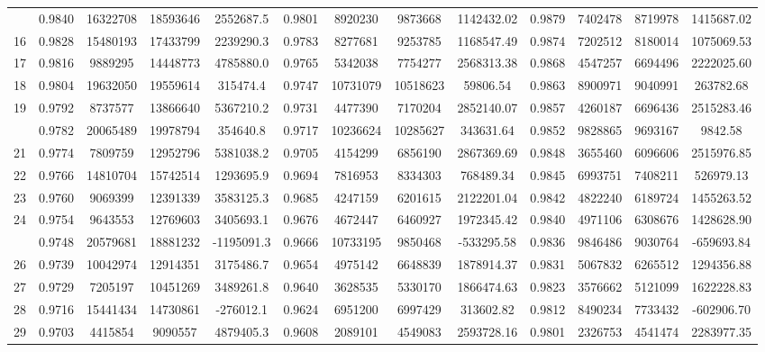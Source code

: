 \documentclass[
  12pt,
]{article}
\begin{document}
\begin{longtable}[t]{lcccccccccccc}
\addlinespace
15 & 0.9840 & 16322708 & 18593646 & 2552687.5 & 0.9801 & 8920230 & 9873668 & 1142432.02 & 0.9879 & 7402478 & 8719978 & 1415687.02\\
16 & 0.9828 & 15480193 & 17433799 & 2239290.3 & 0.9783 & 8277681 & 9253785 & 1168547.49 & 0.9874 & 7202512 & 8180014 & 1075069.53\\
17 & 0.9816 & 9889295 & 14448773 & 4785880.0 & 0.9765 & 5342038 & 7754277 & 2568313.38 & 0.9868 & 4547257 & 6694496 & 2222025.60\\
18 & 0.9804 & 19632050 & 19559614 & 315474.4 & 0.9747 & 10731079 & 10518623 & 59806.54 & 0.9863 & 8900971 & 9040991 & 263782.68\\
19 & 0.9792 & 8737577 & 13866640 & 5367210.2 & 0.9731 & 4477390 & 7170204 & 2852140.07 & 0.9857 & 4260187 & 6696436 & 2515283.46\\
\addlinespace
20 & 0.9782 & 20065489 & 19978794 & 354640.8 & 0.9717 & 10236624 & 10285627 & 343631.64 & 0.9852 & 9828865 & 9693167 & 9842.58\\
21 & 0.9774 & 7809759 & 12952796 & 5381038.2 & 0.9705 & 4154299 & 6856190 & 2867369.69 & 0.9848 & 3655460 & 6096606 & 2515976.85\\
22 & 0.9766 & 14810704 & 15742514 & 1293695.9 & 0.9694 & 7816953 & 8334303 & 768489.34 & 0.9845 & 6993751 & 7408211 & 526979.13\\
23 & 0.9760 & 9069399 & 12391339 & 3583125.3 & 0.9685 & 4247159 & 6201615 & 2122201.04 & 0.9842 & 4822240 & 6189724 & 1455263.52\\
24 & 0.9754 & 9643553 & 12769603 & 3405693.1 & 0.9676 & 4672447 & 6460927 & 1972345.42 & 0.9840 & 4971106 & 6308676 & 1428628.90\\
\addlinespace
25 & 0.9748 & 20579681 & 18881232 & -1195091.3 & 0.9666 & 10733195 & 9850468 & -533295.58 & 0.9836 & 9846486 & 9030764 & -659693.84\\
26 & 0.9739 & 10042974 & 12914351 & 3175486.7 & 0.9654 & 4975142 & 6648839 & 1878914.37 & 0.9831 & 5067832 & 6265512 & 1294356.88\\
27 & 0.9729 & 7205197 & 10451269 & 3489261.8 & 0.9640 & 3628535 & 5330170 & 1866474.63 & 0.9823 & 3576662 & 5121099 & 1622228.83\\
28 & 0.9716 & 15441434 & 14730861 & -276012.1 & 0.9624 & 6951200 & 6997429 & 313602.82 & 0.9812 & 8490234 & 7733432 & -602906.70\\
29 & 0.9703 & 4415854 & 9090557 & 4879405.3 & 0.9608 & 2089101 & 4549083 & 2593728.16 & 0.9801 & 2326753 & 4541474 & 2283977.35\\

\end{longtable}
\end{document}
